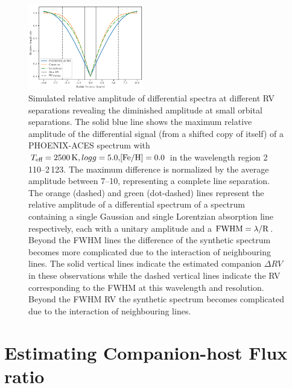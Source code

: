 \begin{figure}
    \centering
    \includegraphics[width=0.45\textwidth]{figures/direct-recovery/rv_diff_final.pdf}
    \caption{Simulated relative amplitude of differential spectra at different {RV} separations revealing the diminished amplitude at small orbital separations. The solid blue line shows the maximum relative amplitude of the differential signal (from a shifted copy of itself) of a {PHOENIX-ACES} spectrum with \(T_{\textrm{eff}}=2500\K{}, logg=5.0, \feh{}=0.0\) in the wavelength region 2\,110--2\,123\nm{}. The maximum difference is normalized by the average amplitude between 7--10\kmps{}, representing a complete line separation. The orange (dashed) and green (dot-dashed) lines represent the relative amplitude of a differential spectrum of a spectrum containing a single Gaussian and single Lorentzian absorption line respectively, each with a unitary amplitude and a \(\rm {FWHM} = \lambda / R\). Beyond the {FWHM} lines the difference of the synthetic spectrum becomes more complicated due to the interaction of neighbouring lines. The solid vertical lines indicate the estimated companion \(\Delta {RV}\) in these observations while the dashed vertical lines indicate the {RV} corresponding to the {FWHM} at this wavelength and resolution. Beyond the {FWHM} {RV} the synthetic spectrum becomes complicated due to the interaction of neighbouring lines.}

    \label{fig:diff_amp}
\end{figure}




\section{Estimating Companion-host Flux ratio}

